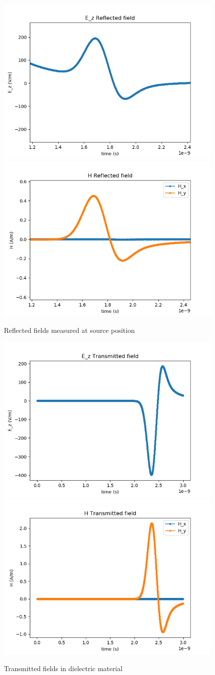 \documentclass[11pt, a4paper]{article}
\begin{document}
\begin{figure}[H]
    \centering
    \includegraphics[width=0.49\linewidth]{halfspace/Ezrzoom.png}
    \includegraphics[width=0.49\linewidth]{halfspace/Hxyrzoom.png}
    \caption{Reflected fields measured at source position}
    \label{hs_source_zoom}
\end{figure}

\begin{figure}[H]
    \centering
    \includegraphics[width=0.49\linewidth]{halfspace/Ezt.png}
    \includegraphics[width=0.49\linewidth]{halfspace/Hxyt.png}
    \caption{Transmitted fields in dielectric material}
    \label{hs_diel}
\end{figure}
\end{document}
